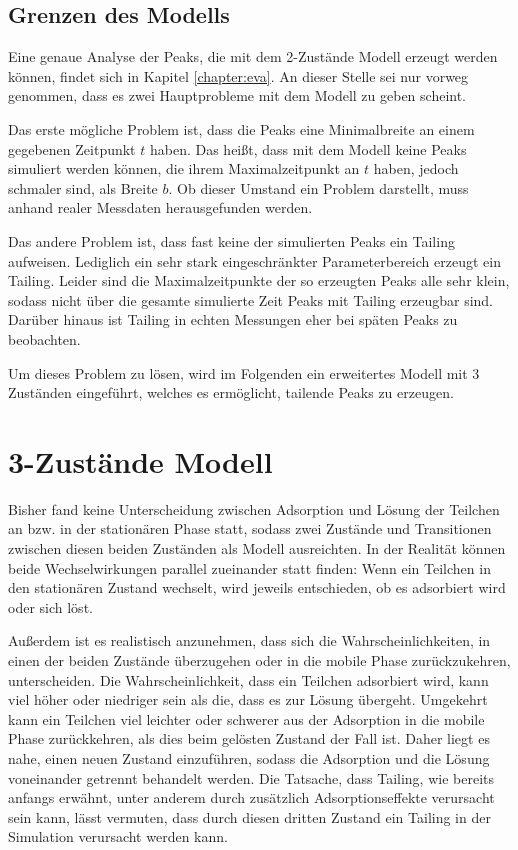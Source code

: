 \subsection{Grenzen des Modells}
Eine genaue Analyse der Peaks, die mit dem 2-Zustände Modell erzeugt werden können, findet sich in Kapitel \ref{chapter:eva}. An dieser Stelle sei nur vorweg genommen, dass es zwei Hauptprobleme mit dem Modell zu geben scheint. 

Das erste mögliche Problem ist, dass die Peaks eine Minimalbreite an einem gegebenen Zeitpunkt $t$ haben. Das heißt, dass mit dem Modell keine Peaks simuliert werden können, die ihrem Maximalzeitpunkt an $t$ haben, jedoch schmaler sind, als Breite $b$. Ob dieser Umstand ein Problem darstellt, muss anhand realer Messdaten herausgefunden werden.

Das andere Problem ist, dass fast keine der simulierten Peaks ein Tailing aufweisen. Lediglich ein sehr stark eingeschränkter Parameterbereich erzeugt ein Tailing. Leider sind die Maximalzeitpunkte der so erzeugten Peaks alle sehr klein, sodass nicht über die gesamte simulierte Zeit Peaks mit Tailing erzeugbar sind. Darüber hinaus ist Tailing in echten Messungen eher bei späten Peaks zu beobachten.

Um dieses Problem zu lösen, wird im Folgenden ein erweitertes Modell mit 3 Zuständen eingeführt, welches es ermöglicht, tailende Peaks zu erzeugen.


\section{3-Zustände Modell} 
\label{chapter:mod:3s}


Bisher fand keine Unterscheidung zwischen Adsorption und Lösung der Teilchen an bzw. in der stationären Phase statt, sodass zwei Zustände und Transitionen zwischen diesen beiden Zuständen als Modell ausreichten. In der Realität können beide Wechselwirkungen parallel zueinander statt finden: Wenn ein Teilchen in den stationären Zustand wechselt, wird jeweils entschieden, ob es adsorbiert wird oder sich löst.

Außerdem ist es realistisch anzunehmen, dass sich die Wahrscheinlichkeiten, in einen der beiden Zustände überzugehen oder in die mobile Phase zurückzukehren, unterscheiden. Die Wahrscheinlichkeit, dass ein Teilchen adsorbiert wird, kann viel höher oder niedriger sein als die, dass es zur Lösung übergeht. Umgekehrt kann ein Teilchen viel leichter oder schwerer aus der Adsorption in die mobile Phase zurückkehren, als dies beim gelösten Zustand der Fall ist. Daher liegt es nahe, einen neuen Zustand einzuführen, sodass die Adsorption und die Lösung voneinander getrennt behandelt werden. Die Tatsache, dass Tailing, wie bereits anfangs erwähnt, unter anderem durch zusätzlich Adsorptionseffekte verursacht sein kann, lässt vermuten, dass durch diesen dritten Zustand ein Tailing in der Simulation verursacht werden kann. 
 

